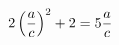 \documentclass[preview]{standalone}
\begin{document}
\begin{align*}
\special{dvisvgm:raw <g id='unique000'>}2\left(\frac{a}{c}\right)^2+2=5\frac{a}{c}\special{dvisvgm:raw </g>}
\end{align*}
\end{document}

